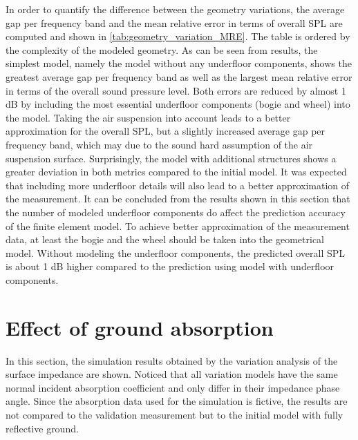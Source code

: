 \noindent In order to quantify the difference between the geometry variations, the average gap per frequency band and the mean relative error in terms of overall SPL are computed and shown in \cref{tab:geometry_variation_MRE}. The table is ordered by the complexity of the modeled geometry. As can be seen from results, the simplest model, namely the model without any underfloor components, shows the greatest average gap per frequency band as well as the largest mean relative error in terms of the overall sound pressure level. Both errors are reduced by almost 1 dB by including the most essential underfloor components (bogie and wheel) into the model. Taking the air suspension into account leads to a better approximation for the overall SPL, but a slightly increased average gap per frequency band, which may due to the sound hard assumption of the air suspension surface. Surprisingly, the model with additional structures shows a greater deviation in both metrics compared to the initial model. It was expected that including more underfloor details will also lead to a better approximation of the measurement. It can be concluded from the results shown in this section that the number of modeled underfloor components do affect the prediction accuracy of the finite element model. To achieve better approximation of the measurement data, at least the bogie and the wheel should be taken into the geometrical model. Without modeling the underfloor components, the predicted overall SPL is about 1 dB higher compared to the prediction using model with underfloor components.

\section{Effect of ground absorption}

In this section, the simulation results obtained by the variation analysis of the surface impedance are shown. Noticed that all variation models have the same normal incident absorption coefficient and only differ in their impedance phase angle. Since the absorption data used for the simulation is fictive, the results are not compared to the validation measurement but to the initial model with fully reflective ground.


